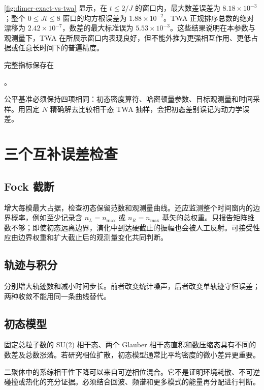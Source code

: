 \cref{fig:dimer-exact-vs-twa} 显示，在 $t\le2/J$ 的窗口内，最大数差误差为 $8.18\times10^{-3}$；整个 $0\le Jt\le8$ 窗口的均方根误差为 $1.88\times10^{-2}$。TWA 正规排序总数的绝对漂移为 $2.42\times10^{-7}$，数差的最大标准误为 $5.53\times10^{-3}$。这些结果说明在本参数与观测量下，TWA 在所展示窗口内表现良好，但不能外推为更强相互作用、更低占据或任意长时间下的普遍精度。

完整指标保存在
\begin{center}
  。
\end{center}

\begin{numericalbox}
公平基准必须保持四项相同：初态密度算符、哈密顿量参数、目标观测量和时间采样。用固定 $N$ 精确解去比较相干态 TWA 抽样，会把初态差别误记为动力学误差。
\end{numericalbox}

\section{三个互补误差检查}

\subsection{Fock 截断}

增大每模最大占据，检查初态保留范数和观测量曲线。还应监测整个时间窗内的边界概率，例如至少记录含 $n_L=n_{\max}$ 或 $n_R=n_{\max}$ 基矢的总权重。只报告矩阵维数不够；即使初态远离边界，演化中到达硬截止的振幅也会被人工反射。可接受性应由边界权重和扩大截止后的观测量变化共同判断。

\subsection{轨迹与积分}

分别增大轨迹数和减小时间步长。前者改变统计噪声，后者改变单轨迹守恒误差；两种收敛不能用同一条曲线替代。

\subsection{初态模型}

固定总粒子数的 SU(2) 相干态、两个 Glauber 相干态直积和数压缩态具有不同的数差及总数涨落。若研究相位扩散，初态模型通常比平均密度的微小差异更重要。

\begin{warningbox}
二聚体中的系综相干性下降可以来自可逆相位混合。它不是证明环境耗散、不可逆碰撞或热化的充分证据。必须结合回波、频谱和更多模式的能量再分配进行判断。
\end{warningbox}

